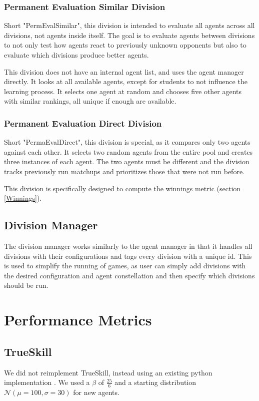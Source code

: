 \subsubsection{Permanent Evaluation Similar Division}\label{PermEvalSimilarDiv}
Short "PermEvalSimilar", this division is intended to evaluate all agents across all divisions, not agents inside itself. The goal is to evaluate agents between divisions to not only test how agents react to previously unknown opponents but also to evaluate which divisions produce better agents.

This division does not have an internal agent list, and uses the agent manager directly. It looks at all available agents, except for students to not influence the learning process. It selects one agent at random and chooses five other agents with similar rankings, all unique if enough are available.

\subsubsection{Permanent Evaluation Direct Division}\label{PermEvaldirectDiv}
Short "PermaEvalDirect", this division is special, as it compares only two agents against each other. It selects two random agents from the entire pool and creates three instances of each agent. The two agents must be different and the division tracks previously run matchups and prioritizes those that were not run before.

This division is specifically designed to compute the winnings metric (section \ref{Winnings}).

\subsection{Division Manager}
The division manager works similarly to the agent manager in that it handles all divisions with their configurations and tags every division with a unique id. This is used to simplify the running of games, as user can simply add divisions with the desired configuration and agent constellation and then specify which divisions should be run.

\section{Performance Metrics}\label{PerformanceMetricsSection}

\subsection{TrueSkill}
We did not reimplement TrueSkill, instead using an existing python implementation \cite{TrueSkill_code}. We used a $\beta$ of $\frac{25}{6}$ and a starting distribution $\mathcal{N}(\mu=100, \sigma=30)$ for new agents.


